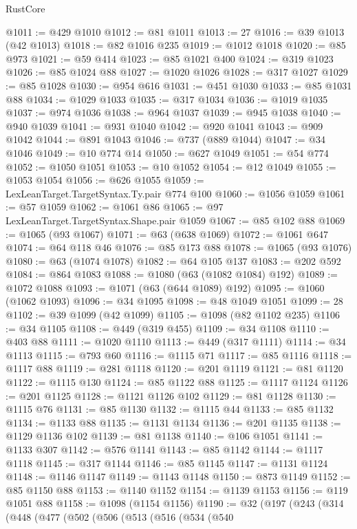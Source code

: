 \begin{lexlean}{RustCore}
\begin{coremodule}
@1011 := @429 @1010
@1012 := @81 @1011
@1013 := 27
@1016 := @39 @1013 (@42 @1013)
@1018 := @82 @1016 @235
@1019 := @1012 @1018
@1020 := @85 @973
@1021 := @59 @414
@1023 := @85 @1021 @400
@1024 := @319 @1023
@1026 := @85 @1024 @88
@1027 := @1020 @1026
@1028 := @317 @1027
@1029 := @85 @1028
@1030 := @954 @616
@1031 := @451 @1030
@1033 := @85 @1031 @88
@1034 := @1029 @1033
@1035 := @317 @1034
@1036 := @1019 @1035
@1037 := @974 @1036
@1038 := @964 @1037
@1039 := @945 @1038
@1040 := @940 @1039
@1041 := @931 @1040
@1042 := @920 @1041
@1043 := @909 @1042
@1044 := @891 @1043
@1046 := @737 (@889 @1044)
@1047 := @34 @1046
@1049 := @10 @774 @14
@1050 := @627 @1049
@1051 := @54 @774
@1052 := @1050 @1051
@1053 := @10 @1052
@1054 := @12 @1049
@1055 := @1053 @1054
@1056 := @626 @1055
@1059 := LexLeanTarget.TargetSyntax.Ty.pair @774 @100
@1060 := @1056 @1059
@1061 := @57 @1059
@1062 := @1061 @86
@1065 := @97 LexLeanTarget.TargetSyntax.Shape.pair @1059
@1067 := @85 @102 @88
@1069 := @1065 (@93 @1067)
@1071 := @63 (@638 @1069)
@1072 := @1061 @647
@1074 := @64 @118 @46
@1076 := @85 @173 @88
@1078 := @1065 (@93 @1076)
@1080 := @63 (@1074 @1078)
@1082 := @64 @105 @137
@1083 := @202 @592
@1084 := @864 @1083
@1088 := @1080 (@63 (@1082 @1084) @192)
@1089 := @1072 @1088
@1093 := @1071 (@63 (@644 @1089) @192)
@1095 := @1060 (@1062 @1093)
@1096 := @34 @1095
@1098 := @48 @1049 @1051
@1099 := 28
@1102 := @39 @1099 (@42 @1099)
@1105 := @1098 (@82 @1102 @235)
@1106 := @34 @1105
@1108 := @449 (@319 @455)
@1109 := @34 @1108
@1110 := @403 @88
@1111 := @1020 @1110
@1113 := @449 (@317 @1111)
@1114 := @34 @1113
@1115 := @793 @60
@1116 := @1115 @71
@1117 := @85 @1116
@1118 := @1117 @88
@1119 := @281 @1118
@1120 := @201 @1119
@1121 := @81 @1120
@1122 := @1115 @130
@1124 := @85 @1122 @88
@1125 := @1117 @1124
@1126 := @201 @1125
@1128 := @1121 @1126 @102
@1129 := @81 @1128
@1130 := @1115 @76
@1131 := @85 @1130
@1132 := @1115 @44
@1133 := @85 @1132
@1134 := @1133 @88
@1135 := @1131 @1134
@1136 := @201 @1135
@1138 := @1129 @1136 @102
@1139 := @81 @1138
@1140 := @106 @1051
@1141 := @1133 @307
@1142 := @576 @1141
@1143 := @85 @1142
@1144 := @1117 @1118
@1145 := @317 @1144
@1146 := @85 @1145
@1147 := @1131 @1124
@1148 := @1146 @1147
@1149 := @1143 @1148
@1150 := @873 @1149
@1152 := @85 @1150 @88
@1153 := @1140 @1152
@1154 := @1139 @1153
@1156 := @119 @1051 @88
@1158 := @1098 (@1154 @1156)
@1190 := @32
    (@197
      (@243
        (@314
          (@448
            (@477
              (@502
                (@506
                  (@513
                    (@516
                      (@534
                        (@540

\end{coremodule}
\end{lexlean}
